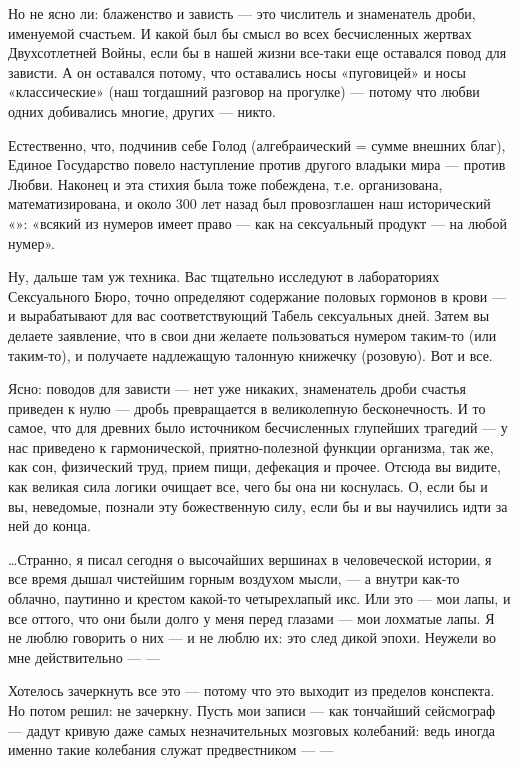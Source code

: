 \documentclass[11pt,openany]{book}
\begin{document}
Но не ясно ли: блаженство и зависть --- это числитель и знаменатель дроби, именуемой счастьем. И какой был бы смысл во всех бесчисленных жертвах Двухсотлетней Войны, если бы в нашей жизни все-таки еще оставался повод для зависти. А он оставался потому, что оставались носы «пуговицей» и носы «классические» (наш тогдашний разговор на прогулке) --- потому что любви одних добивались многие, других --- никто.

Естественно, что, подчинив себе Голод (алгебраический = сумме внешних благ), Единое Государство повело наступление против другого владыки мира --- против Любви. Наконец и эта стихия была тоже побеждена, т.е. организована, математизирована, и около 300 лет назад был провозглашен наш исторический «»: «всякий из нумеров имеет право --- как на сексуальный продукт --- на любой нумер».

Ну, дальше там уж техника. Вас тщательно исследуют в лабораториях Сексуального Бюро, точно определяют содержание половых гормонов в крови --- и вырабатывают для вас соответствующий Табель сексуальных дней. Затем вы делаете заявление, что в свои дни желаете пользоваться нумером таким-то (или таким-то), и получаете надлежащую талонную книжечку (розовую). Вот и все.

Ясно: поводов для зависти --- нет уже никаких, знаменатель дроби счастья приведен к нулю --- дробь превращается в великолепную бесконечность. И то самое, что для древних было источником бесчисленных глупейших трагедий --- у нас приведено к гармонической, приятно-полезной функции организма, так же, как сон, физический труд, прием пищи, дефекация и прочее. Отсюда вы видите, как великая сила логики очищает все, чего бы она ни коснулась. О, если бы и вы, неведомые, познали эту божественную силу, если бы и вы научились идти за ней до конца.

\ldots{}Странно, я писал сегодня о высочайших вершинах в человеческой истории, я все время дышал чистейшим горным воздухом мысли, --- а внутри как-то облачно, паутинно и крестом какой-то четырехлапый икс. Или это --- мои лапы, и все оттого, что они были долго у меня перед глазами --- мои лохматые лапы. Я не люблю говорить о них --- и не люблю их: это след дикой эпохи. Неужели во мне действительно --- ---

Хотелось зачеркнуть все это --- потому что это выходит из пределов конспекта. Но потом решил: не зачеркну. Пусть мои записи --- как тончайший сейсмограф --- дадут кривую даже самых незначительных мозговых колебаний: ведь иногда именно такие колебания служат предвестником --- ---
\end{document}
